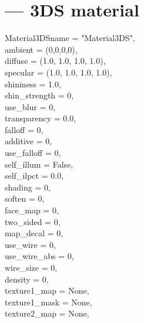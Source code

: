 
\section{ ---
         3DS material}

\begin{classdesc}{Material3DS}{name = "Material3DS",\\ 
                              ambient = (0,0,0,0),\\
                              diffuse = (1.0, 1.0, 1.0, 1.0),\\
                              specular = (1.0, 1.0, 1.0, 1.0),\\
                              shininess = 1.0,\\
                              shin_strength = 0,\\
                              use_blur = 0,\\
                              transparency = 0.0,\\
                              falloff = 0,\\
                              additive = 0,\\
                              use_falloff = 0,\\
                              self_illum = False,\\
                              self_ilpct = 0.0,\\
                              shading = 0,\\
                              soften = 0,\\
                              face_map = 0,\\
                              two_sided = 0,\\
                              map_decal = 0,\\
                              use_wire = 0,\\
                              use_wire_abs = 0,\\
                              wire_size = 0,\\
                              density = 0,\\
                              texture1_map = None,\\
                              texture1_mask = None,\\
                              texture2_map = None,\\
}
\end{classdesc}
